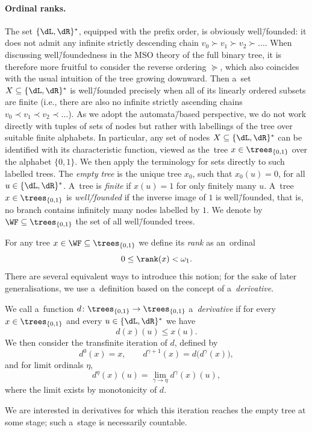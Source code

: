 \paragraph*{Ordinal ranks.}
The set $\{\dL,\dR\}^\ast$,
equipped with the prefix order, is obviously well\=/founded: it does not admit any infinite strictly descending chain $v_0 \succ v_1 \succ v_2 \succ \ldots$.
When discussing well\=/foundedness in the MSO theory of the full binary tree, it is therefore more fruitful to consider the reverse ordering
$\succeq$, which also coincides with the usual intuition of the tree growing downward.
Then a~set $X \subseteq \{\dL,\dR\}^\ast$ is well\=/founded precisely when all of its linearly ordered subsets are finite
(i.e., there are also no infinite strictly ascending chains $v_0 \prec v_1 \prec v_2 \prec \ldots$).
As we adopt the automata\=/based perspective, we do not work directly with tuples of
sets of nodes but rather with labellings of the tree over suitable finite alphabets. In particular, any set of nodes
$X\subseteq \{\dL,\dR\}^\ast$ can be identified with its characteristic function, viewed as the~tree $x\in\trees_{\{0,1\}}$ over the alphabet $\{0,1\}$.
We then apply the terminology for sets directly to such labelled trees.
The \emph{empty tree} is the unique tree $x_0$, such that $x_0(u)=0$, for all $u\in\{\dL,\dR\}^\ast$.
A~tree is \emph{finite} if $x(u)=1$ for only finitely many $u$.
A~tree $x\in\trees_{\{0,1\}}$ is \emph{well\=/founded} if the inverse image of $1$ is well\=/founded, that is, no branch contains infinitely many nodes labelled by $1$.
We denote by $\WF\subseteq\trees_{\{0,1\}}$ the
set of all well\=/founded trees.

For any tree $x \in \WF \subseteq \trees_{\{0,1\}}$ we define its \emph{rank} as an~ordinal
\[ 0 \leq \rank(x) < \omega_1. \]
There are several equivalent ways to introduce this notion; for the sake of later generalisations, we use a~definition based on the concept of a~\emph{derivative}.

We call a~function $d \colon \trees_{\{0,1\}} \to \trees_{\{0,1\}}$ a~\emph{derivative} if for every $x \in \trees_{\{0,1\}}$ and every $u \in \{\dL,\dR\}^\ast$ we have
\[ d(x)(u) \leq x(u). \]
We then consider the transfinite iteration of $d$, defined by
\[
d^0(x) = x,\qquad
d^{\gamma+1}(x) = d\bigl(d^\gamma(x)\bigr),
\]
and for limit ordinals $\eta$,
\[
d^\eta(x)(u) = \lim_{\gamma \to \eta} d^\gamma(x)(u),
\]
where the limit exists by monotonicity of $d$.

We are interested in derivatives for which this iteration reaches the empty tree at some stage; such a~stage is necessarily countable.

